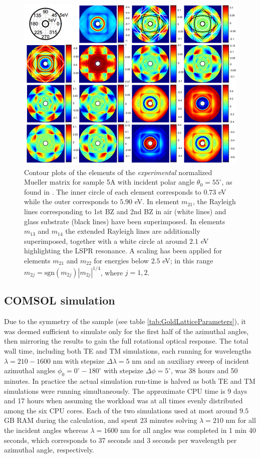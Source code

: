 \begin{figure}  %
    \centering
    \includegraphics[width=\linewidth, trim=0cm 0cm 0cm 0cm, clip]{figures/ch4/S5A/expdata/S5A_MM_rot_55.png}
    \caption{Contour plots of the elements of the \emph{experimental} normalized Mueller matrix for sample 5A with incident polar angle $\theta_0=55^\circ$, as found in \cite{Brakstad:15}. The inner circle of each element corresponds to $0.73$ eV while the outer corresponds to $5.90$ eV. In element $m_{21}$, the Rayleigh lines corresponding to 1st BZ and 2nd BZ in air (white lines) and glass substrate (black lines) have been superimposed. In elements $m_{13}$ and $m_{14}$ the extended Rayleigh lines are additionally superimposed, together with a white circle at around $2.1$ eV highlighting the LSPR resonance. A scaling has been applied for elements $m_{21}$ and $m_{22}$ for energies below $2.5$ eV; in this range $m_{2j}=\text{sgn}(m_{2j})|m_{2j}|^{1/4}$, where $j=1,2$.}%
    \label{fig:S5A_contour_MM_exp}
\end{figure}

\subsection{COMSOL simulation}
Due to the symmetry of the sample (see table \ref{tab:GoldLatticeParameters}), it was deemed sufficient to simulate only for the first half of the azimuthal angles, then mirroring the results to gain the full rotational optical response. The total wall time, including both TE and TM simulations, each running for wavelengths $\lambda=210-1600$ nm with stepsize $\Delta\lambda=5$ nm and an auxiliary sweep of incident azimuthal angles $\phi_0=0^\circ-180^\circ$ with stepsize $\Delta\phi=5^\circ$, was 38 hours and 50 minutes. In practice the actual simulation run-time is halved as both TE and TM simulations were running simultaneously. The approximate CPU time is 9 days and 17 hours when assuming the workload was at all times evenly distributed among the six CPU cores. Each of the two simulations used at most around $9.5$ GB RAM during the calculation, and spent 23 minutes solving $\lambda=210$ nm for all the incident angles whereas $\lambda=1600$ nm for all angles was completed in 1 min 40 seconds, which corresponds to 37 seconds and 3 seconds per wavelength per azimuthal angle, respectively. 

